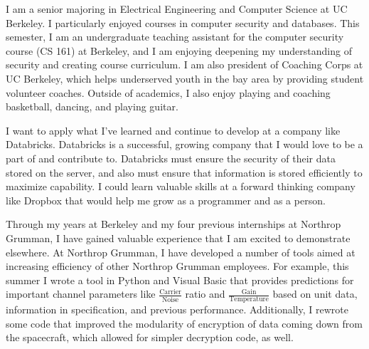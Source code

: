 \documentclass[11pt, a4paper]{awesome-cv}
\begin{document}
\makecvheader

\makelettertitle

\begin{cvletter}
I am a senior majoring in Electrical Engineering and Computer Science at UC Berkeley. I particularly enjoyed courses in computer security and databases. This semester, I am an undergraduate teaching assistant for the computer security course (CS 161) at Berkeley, and I am enjoying deepening my understanding of security and creating course curriculum. I am also president of Coaching Corps at UC Berkeley, which helps underserved youth in the bay area by providing student volunteer coaches. Outside of academics, I also enjoy playing and coaching basketball, dancing, and playing guitar.

I want to apply what I've learned and continue to develop at a company like Databricks. Databricks is a successful, growing company that I would love to be a part of and contribute to. Databricks must ensure the security of their data stored on the server, and also must ensure that information is stored efficiently to maximize capability. I could learn valuable skills at a forward thinking company like Dropbox that would help me grow as a programmer and as a person.

Through my years at Berkeley and my four previous internships at Northrop Grumman, I have gained valuable experience that I am excited to demonstrate elsewhere. At Northrop Grumman, I have developed a number of tools aimed at increasing efficiency of other Northrop Grumman employees. For example, this summer I wrote a tool in Python and Visual Basic that provides predictions for important channel parameters like $\frac{\text{Carrier}}{\text{Noise}}$ ratio and $\frac{\text{Gain}}{\text{Temperature}}$ based on unit data, information in specification, and previous performance. Additionally, I rewrote some code that improved the modularity of encryption of data coming down from the spacecraft, which allowed for simpler decryption code, as well.

\end{cvletter}

\makeletterclosing
\end{document}

